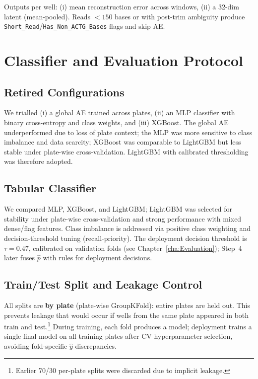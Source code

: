 Outputs per well: (i) mean reconstruction error across windows, (ii) a 32-dim latent (mean-pooled). Reads $<150$ bases or with post-trim ambiguity produce \texttt{Short\_Read}/\texttt{Has\_Non\_ACTG\_Bases} flags and skip AE.

\section{Classifier and Evaluation Protocol}
\label{sec:clf}

\subsection{Retired Configurations}
\label{sec:retired_configs}
We trialled (i) a global AE trained across plates, (ii) an MLP classifier with binary cross-entropy and class weights, and (iii) XGBoost. The global AE underperformed due to loss of plate context; the MLP was more sensitive to class imbalance and data scarcity; XGBoost was comparable to LightGBM but less stable under plate-wise cross-validation. LightGBM with calibrated thresholding was therefore adopted.

\subsection{Tabular Classifier}
We compared MLP, XGBoost, and LightGBM; LightGBM was selected for stability under plate-wise cross-validation and strong performance with mixed dense/flag features. Class imbalance is addressed via positive class weighting and decision-threshold tuning (recall-priority). The deployment decision threshold is $\tau=0.47$, calibrated on validation folds (see Chapter~\ref{cha:Evaluation}); Step~4 later fuses $\hat p$ with rules for deployment decisions.

\subsection{Train/Test Split and Leakage Control}
All splits are \textbf{by plate} (plate-wise GroupKFold): entire plates are held out. This prevents leakage that would occur if wells from the same plate appeared in both train and test.\footnote{Earlier 70/30 per-plate splits were discarded due to implicit leakage.}
During training, each fold produces a model; deployment trains a single final model on all training plates after CV hyperparameter selection, avoiding fold-specific $\hat{y}$ discrepancies.


